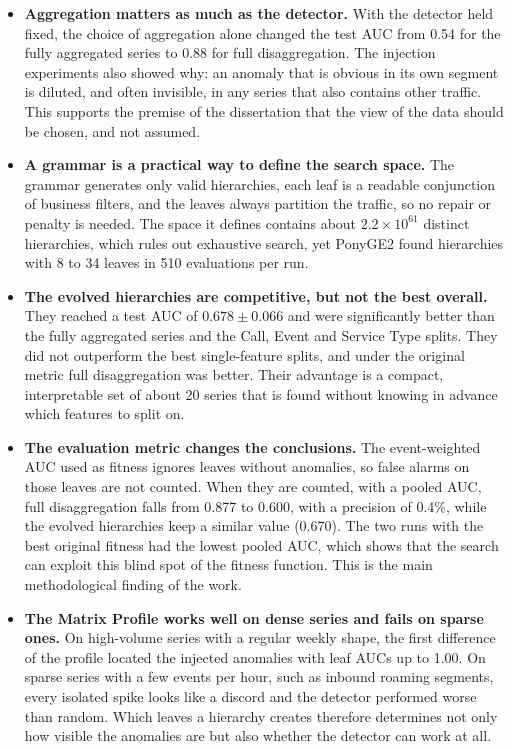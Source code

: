 \begin{itemize}
    \item \textbf{Aggregation matters as much as the detector.}
    With the detector held fixed, the choice of aggregation alone changed the test \ac{AUC} from 0.54 for the fully aggregated series to 0.88 for full disaggregation.
    The injection experiments also showed why: an anomaly that is obvious in its own segment is diluted, and often invisible, in any series that also contains other traffic.
    This supports the premise of the dissertation that the view of the data should be chosen, and not assumed.

    \item \textbf{A grammar is a practical way to define the search space.}
    The grammar generates only valid hierarchies, each leaf is a readable conjunction of business filters, and the leaves always partition the traffic, so no repair or penalty is needed.
    The space it defines contains about $2.2 \times 10^{61}$ distinct hierarchies, which rules out exhaustive search, yet PonyGE2 found hierarchies with 8 to 34 leaves in 510 evaluations per run.

    \item \textbf{The evolved hierarchies are competitive, but not the best overall.}
    They reached a test \ac{AUC} of $0.678 \pm 0.066$ and were significantly better than the fully aggregated series and the Call, Event and Service Type splits.
    They did not outperform the best single-feature splits, and under the original metric full disaggregation was better.
    Their advantage is a compact, interpretable set of about 20 series that is found without knowing in advance which features to split on.

    \item \textbf{The evaluation metric changes the conclusions.}
    The event-weighted \ac{AUC} used as fitness ignores leaves without anomalies, so false alarms on those leaves are not counted.
    When they are counted, with a pooled \ac{AUC}, full disaggregation falls from 0.877 to 0.600, with a precision of 0.4\%, while the evolved hierarchies keep a similar value (0.670).
    The two runs with the best original fitness had the lowest pooled \ac{AUC}, which shows that the search can exploit this blind spot of the fitness function.
    This is the main methodological finding of the work.

    \item \textbf{The Matrix Profile works well on dense series and fails on sparse ones.}
    On high-volume series with a regular weekly shape, the first difference of the profile located the injected anomalies with leaf \ac{AUC}s up to 1.00.
    On sparse series with a few events per hour, such as inbound roaming segments, every isolated spike looks like a discord and the detector performed worse than random.
    Which leaves a hierarchy creates therefore determines not only how visible the anomalies are but also whether the detector can work at all.


\end{itemize}
